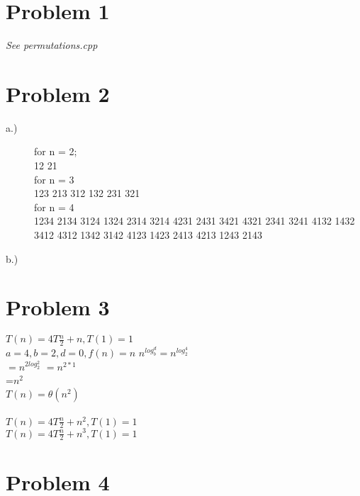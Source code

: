 \documentclass[12pt,letterpaper]{article}
\begin{document}
\section*{Problem 1}
\textit{See permutations.cpp}


\section*{Problem 2}
\begin{description}
\item[a.)] for n = 2;\\
12 21\\
for n = 3\\
123 213 312 132 231 321\\
for n = 4\\
1234 2134 3124 1324 2314 3214 4231 2431 3421 4321 2341 3241 4132 1432 3412 4312 1342 3142 4123 1423 2413 4213 1243 2143
\item[b.)]
\end{description}

\section*{Problem 3}
$T(n) = 4T\frac{n}{2}+n, T(1) = 1$\\
$a = 4, b = 2, d = 0, f(n) = n$ \therefore{} $n^{log_{b}^{d}} = n^{log_{2}^{4}}$\\
$=n^{2log^{2}_{2}}$
$=n^{2*1}$\\
=$n^2$\\
\therefore{} $T(n) = \theta(n^2)$\\\\
$T(n) = 4T\frac{n}{2}+n^2, T(1) = 1$\\
$T(n) = 4T\frac{n}{2}+n^3, T(1) = 1$\\

\section*{Problem 4}
\end{document}
